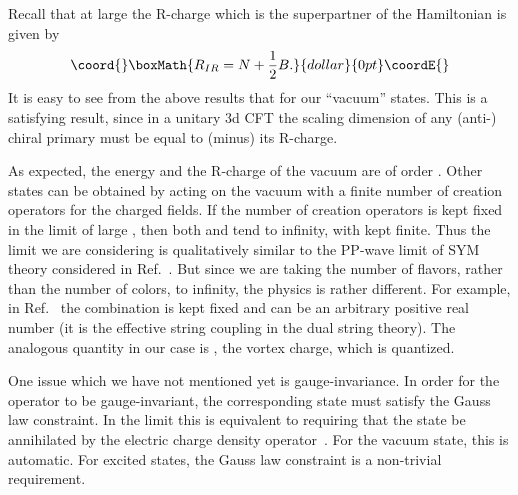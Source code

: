 \documentclass[a4paper,12pt, amsfonts, amssymb]{article}
\providecommand{\ra}{\rightarrow}
\begin{document}
Recall that at large \coordHE{} the R-charge which is the superpartner of the
Hamiltonian is given by
$$\coord{}\boxMath{
R_{IR}=N+\frac{1}{2}B.
}{dollar}{0pt}\coordE{}$$
It is easy to see from the above results that \coordHE{} 
for our ``vacuum'' states. This is a satisfying result, since in a unitary 
3d CFT the scaling dimension of any (anti-) chiral primary must be equal to 
(minus) its R-charge.

As expected, the energy and the R-charge of the vacuum are of order
\coordHE{}. Other states can be obtained by acting on the vacuum with a finite
number of creation operators for the charged fields. If the number of
creation operators is kept fixed in the limit of large \coordHE{}, then
both \coordHE{} and \coordHE{} tend to infinity, with \coordHE{} kept finite. Thus the limit we are considering is qualitatively similar to the PP-wave limit of
\coordHE{}  \coordHE{} SYM theory considered in Ref.~\cite{BMN}. But since we are
taking the number of flavors, rather than the number of colors, to
infinity, the physics is rather different. For example, in Ref.~\cite{BMN}
the combination \coordHE{} is kept fixed and can be an arbitrary positive real number (it is the effective string coupling in the dual string theory). 
The analogous quantity in our case is \coordHE{}, the vortex charge, 
which is quantized.


One issue which we have not mentioned yet is gauge-invariance.
In order for the operator to be gauge-invariant, the corresponding state
must satisfy the Gauss law constraint. In the limit \myHighlight{$e\ra\infty$}\coordHE{}
this is equivalent to requiring that the state be annihilated by
the electric charge density operator~\cite{BKWone}. For the vacuum state, 
this is automatic.
For excited states, the Gauss law constraint is a non-trivial requirement.
\end{document}

